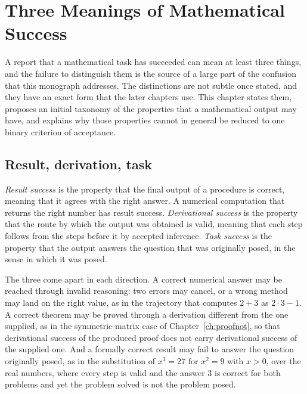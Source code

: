 \chapter{Three Meanings of Mathematical Success}
\label{ch:success}

A report that a mathematical task has succeeded can mean at least three things, and the failure to distinguish them is the source of a large part of the confusion that this monograph addresses. The distinctions are not subtle once stated, and they have an exact form that the later chapters use. This chapter states them, proposes an initial taxonomy of the properties that a mathematical output may have, and explains why those properties cannot in general be reduced to one binary criterion of acceptance.

\section{Result, derivation, task}

\emph{Result success} is the property that the final output of a procedure is correct, meaning that it agrees with the right answer. A numerical computation that returns the right number has result success. \emph{Derivational success} is the property that the route by which the output was obtained is valid, meaning that each step follows from the steps before it by accepted inference. \emph{Task success} is the property that the output answers the question that was originally posed, in the sense in which it was posed.

The three come apart in each direction. A correct numerical answer may be reached through invalid reasoning: two errors may cancel, or a wrong method may land on the right value, as in the trajectory that computes $2 + 3$ as $2 \cdot 3 - 1$. A correct theorem may be proved through a derivation different from the one supplied, as in the symmetric-matrix case of Chapter~\ref{ch:proofnot}, so that derivational success of the produced proof does not carry derivational success of the supplied one. And a formally correct result may fail to answer the question originally posed, as in the substitution of $x^3 = 27$ for $x^2 = 9$ with $x > 0$, over the real numbers, where every step is valid and the answer $3$ is correct for both problems and yet the problem solved is not the problem posed.

